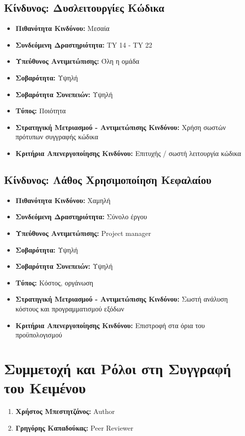 \documentclass[12pt,a4paper]{article}
\begin{document}
\subsection{Κίνδυνος: Δυσλειτουργίες Κώδικα}
\begin{itemize}
	\item \textbf{Πιθανότητα Κινδύνου:} Μεσαία
	\item \textbf{Συνδεόμενη Δραστηριότητα:} TY 14 - TY 22
	\item \textbf{Υπεύθυνος Αντιμετώπισης:} Όλη η ομάδα
	\item \textbf{Σοβαρότητα:} Υψηλή
	\item \textbf{Σοβαρότητα Συνεπειών:} Υψηλή
	\item \textbf{Τύπος:} Ποιότητα
	\item \textbf{Στρατηγική Μετριασμού - Αντιμετώπισης Κινδύνου:} Χρήση σωστών πρότυπων συγγραφής κώδικα
	\item \textbf{Κριτήρια Απενεργοποίησης Κινδύνου:} Επιτυχής / σωστή λειτουργία κώδικα
\end{itemize}

\subsection{Κίνδυνος: Λάθος Χρησιμοποίηση Κεφαλαίου}
\begin{itemize}
	\item \textbf{Πιθανότητα Κινδύνου:} Χαμηλή
	\item \textbf{Συνδεόμενη Δραστηριότητα:} Σύνολο έργου
	\item \textbf{Υπεύθυνος Αντιμετώπισης:} Project manager
	\item \textbf{Σοβαρότητα:} Υψηλή
	\item \textbf{Σοβαρότητα Συνεπειών:} Υψηλή
	\item \textbf{Τύπος:} Κόστος, οργάνωση
	\item \textbf{Στρατηγική Μετριασμού - Αντιμετώπισης Κινδύνου:} Σωστή ανάλυση κόστους και προγραμματισμού εξόδων 
	\item \textbf{Κριτήρια Απενεργοποίησης Κινδύνου:} Επιστροφή στα όρια του προϋπολογισμού
\end{itemize}

\section{Συμμετοχή και Ρόλοι στη Συγγραφή του Κειμένου}
\begin{enumerate}
	\item \textbf{Χρήστος Μπεστητζάνος:} Author
	\item \textbf{Γρηγόρης Καπαδούκας:} Peer Reviewer
\end{enumerate}
\end{document}
